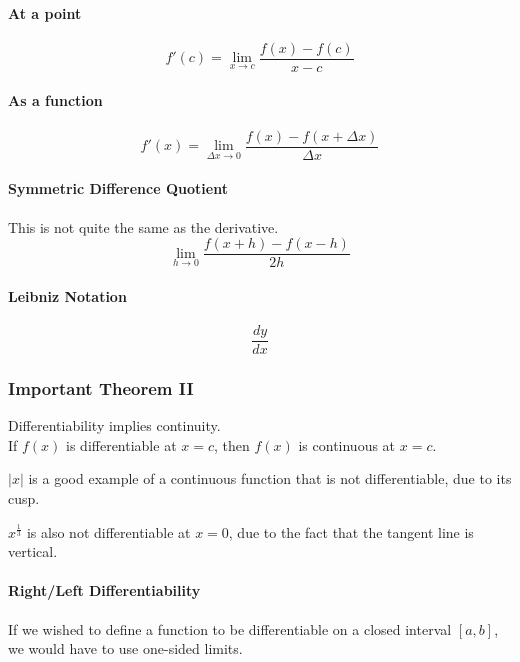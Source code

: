 \documentclass{article}
\begin{document}
\paragraph{At a point}
$$f'(c) = \lim_{x\to c} \frac{f(x) - f(c)}{x-c}$$

\paragraph{As a function}
$$f'(x) = \lim_{\Delta x\to 0} \frac{f(x) - f(x+\Delta x)}{\Delta x}$$

\paragraph{Symmetric Difference Quotient}
This is not quite the same as the derivative.
$$\lim_{h\to 0} \frac{f(x+h) - f(x-h)}{2h}$$

\paragraph{Leibniz Notation}
$$\frac{dy}{dx}$$
\subsubsection{Important Theorem II}
Differentiability implies continuity.\\
If $f(x)$ is differentiable at $x=c$, then $f(x)$ is continuous at $x=c$.

$|x|$ is a good example of a continuous function that is not differentiable, due to its cusp.

$x^\frac{1}{3}$ is also not differentiable at $x=0$, due to the fact that the tangent line is vertical.

\paragraph{Right/Left Differentiability}
If we wished to define a function to be differentiable on a closed interval $[a,b]$, we would have to use one-sided limits.
\end{document}
